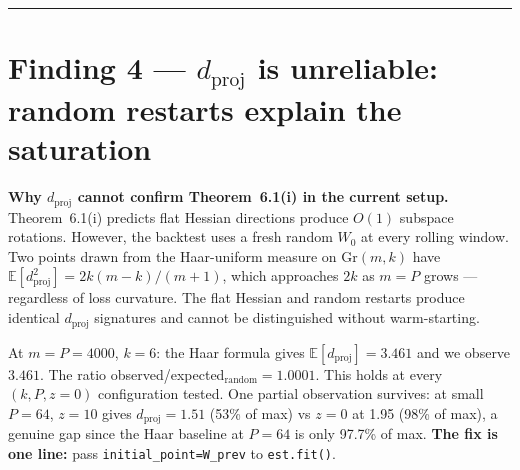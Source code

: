 \documentclass[11pt,a4paper]{article}
\begin{document}
\noindent\rule{\textwidth}{0.4pt}

\section*{Finding 4 — $d_{\mathrm{proj}}$ is unreliable: random restarts explain the saturation}

\begin{annred}
\small\textbf{Why $d_{\mathrm{proj}}$ cannot confirm Theorem~6.1(i) in the current setup.}
Theorem~6.1(i) predicts flat Hessian directions produce $O(1)$ subspace rotations.
However, the backtest uses a fresh random $W_0$ at every rolling window.
Two points drawn from the Haar-uniform measure on $\mathrm{Gr}(m,k)$ have
$\mathbb{E}[d_{\mathrm{proj}}^2] = 2k(m-k)/(m+1)$, which approaches $2k$ as $m=P$ grows
--- regardless of loss curvature. The flat Hessian and random restarts produce identical
$d_{\mathrm{proj}}$ signatures and cannot be distinguished without warm-starting.
\end{annred}

At $m=P=4000$, $k=6$: the Haar formula gives $\mathbb{E}[d_{\mathrm{proj}}]=3.461$
and we observe $3.461$. The ratio observed/expected$_{\mathrm{random}}=1.0001$.
This holds at every $(k,P,z=0)$ configuration tested.
One partial observation survives: at small $P=64$, $z=10$ gives $d_{\mathrm{proj}}=1.51$
(53\% of max) vs $z=0$ at 1.95 (98\% of max), a genuine gap since the Haar baseline
at $P=64$ is only 97.7\% of max.
\textbf{The fix is one line:} pass \texttt{initial\_point=W\_prev} to \texttt{est.fit()}.
\end{document}
